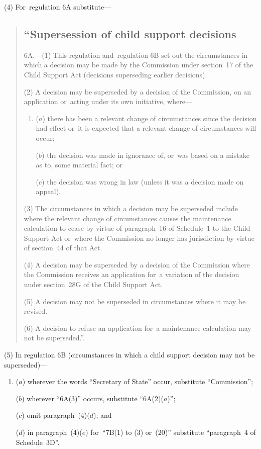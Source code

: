 \documentclass[12pt,a4paper]{article}
\begin{document}
(4) For~regulation 6A substitute—
\begin{quotation}
\subsection*{“Supersession of child support decisions}

6A.---(1)  This regulation and~regulation 6B set out the circumstances in which a decision may be made by the Commission under section~17 of the Child Support Act (decisions superseding earlier decisions).

(2) A decision may be superseded by a decision of the Commission, on an application or~acting under its own initiative, where—
\begin{enumerate}\item[]
($a$) there has been a relevant change of circumstances since the decision had effect or~it is expected that a relevant change of circumstances will occur;

($b$) the decision was made in ignorance of, or~was based on a mistake as to, some material fact; or

($c$) the decision was wrong in law (unless it was a decision made on appeal).
\end{enumerate}

(3) The circumstances in which a decision may be superseded include where the relevant change of circumstances causes the maintenance calculation to cease by virtue of paragraph~16 of Schedule~1 to the Child Support Act or~where the Commission no longer has jurisdiction by virtue of section~44 of that Act.

(4) A decision may be superseded by a decision of the Commission where the Commission receives an application for~a variation of the decision under section~28G of the Child Support Act.

(5) A decision may not be superseded in circumstances where it may be revised.

(6) A decision to refuse an application for~a maintenance calculation may not be superseded.”.
\end{quotation}

(5) In regulation 6B (circumstances in which a child support decision may not be superseded)—
\begin{enumerate}\item[]
($a$) wherever the words “Secretary of State” occur, substitute “Commission”;

($b$) wherever “6A(3)” occurs, substitute “6A(2)($a$)”;

($c$) omit paragraph~(4)($d$); and

($d$) in paragraph~(4)($e$)  for~“7B(1) to (3) or~(20)” substitute “paragraph~4 of Schedule~3D”.
\end{enumerate}
\end{document}
